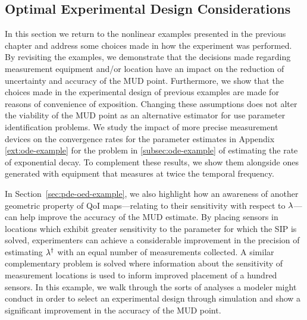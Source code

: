 \subsection{Optimal Experimental Design Considerations}

In this section we return to the nonlinear examples presented in the previous chapter and address some choices made in how the experiment was performed.
By revisiting the examples, we demonstrate that the decisions made regarding measurement equipment and/or location have an impact on the reduction of uncertainty and accuracy of the MUD point.
Furthermore, we show that the choices made in the experimental design of previous examples are made for reasons of convenience of exposition.
Changing these assumptions does not alter the viability of the MUD point as an alternative estimator for use parameter identification problems.
We study the impact of more precise measurement devices on the convergence rates for the parameter estimates in Appendix \ref{ext:ode-example} for the problem in \ref{subsec:ode-example} of estimating the rate of exponential decay.
To complement these results, we show them alongside ones generated with equipment that measures at twice the temporal frequency.

In Section~\ref{sec:pde-oed-example}, we also highlight how an awareness of another geometric property of QoI maps---relating to their sensitivity with respect to $\lambda$---can help improve the accuracy of the MUD estimate.
By placing sensors in locations which exhibit greater sensitivity to the parameter for which the SIP is solved, experimenters can achieve a considerable improvement in the precision of estimating $\lambda^\dagger$ with an equal number of measurements collected.
A similar complementary problem is solved where information about the sensitivity of measurement locations is used to inform improved placement of a hundred sensors.
In this example, we walk through the sorts of analyses a modeler might conduct in order to select an experimental design through simulation and show a significant improvement in the accuracy of the MUD point.


\FloatBarrier

